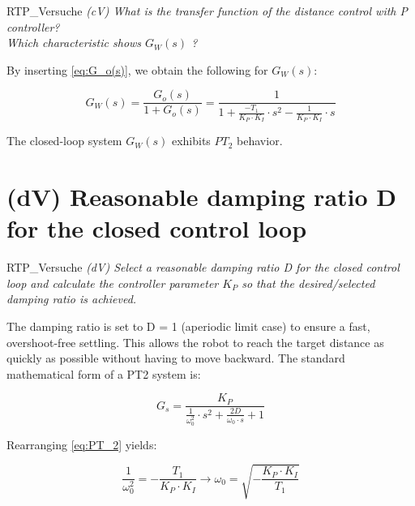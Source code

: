 \documentclass[12pt, oneside, a4paper]{scrreprt}
\begin{document}
            \begin{displaycquote}{RTP_Versuche}
                \footnotesize{\textit{(cV) What is the transfer function of the distance control with P controller?\\
                Which characteristic shows $G_W(s)$ ?}}
            \end{displaycquote}\label{task(cV)}

            By inserting \ref{eq:G_o(s)}, we obtain the following for $G_W(s)$:

            \begin{equation}
                G_W(s) = \frac{G_o(s)}{1 + G_o(s)} = \frac{1}{1 + \frac{-T_1}{K_P\cdot K_I}  \cdot s^2 - \frac{1}{K_P\cdot K_I}\cdot s}
            \end{equation}\label{eq:G_W(s)}  

            The closed-loop system $G_W(s)$ exhibits $PT_2$ behavior.


        \section{(dV) Reasonable damping ratio D for the closed control loop}\label{sec:d-reasonable-damping-ratio}

            \begin{displaycquote}{RTP_Versuche}
                \footnotesize{\textit{(dV) Select a reasonable damping ratio D for the closed control loop and calculate the controller parameter $K_P$ so that the desired/selected damping ratio is achieved.}}
            \end{displaycquote}\label{task(dV)}
            
            The damping ratio is set to D = 1 (aperiodic limit case) to ensure a fast, overshoot-free settling. This allows the robot to reach the target distance as quickly as possible without having to move backward. The standard mathematical form of a PT2 system is:

            \begin{equation}
                G_s = \frac{K_P}{\frac{1}{\omega _0^2} \cdot s^2 + \frac{2D}{\omega _0 \cdot s} + 1}
            \end{equation}\label{eq:PT_2}

            Rearranging \ref{eq:PT_2} yields:

            \begin{equation}
                \frac{1}{\omega _0 ^2} = - \frac{T_1}{K_P \cdot K_I} \rightarrow \omega_0 = \sqrt{-\frac{K_P \cdot K_I}{T_1}}
                \label{eq:w_0}
            \end{equation}
\end{document}
